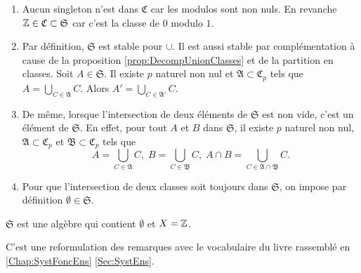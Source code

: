 \begin{rems}
 \begin{enumerate}
  \item  Aucun singleton n'est dans $\mathfrak{C}$ car les modulos sont non nuls. En revanche $\mathbb{Z} \in \mathfrak{C} \subset \mathfrak{S}$ car c'est la classe de $0$ modulo $1$.

  \item Par définition, $\mathfrak{S}$ est stable pour $\cup$. Il est aussi stable par complémentation à cause de la proposition \ref{prop:DecompUnionClasses} et de la partition en classes. Soit $A\in \mathfrak{S}$. Il existe $p$ naturel non nul et $\mathfrak{A}\subset \mathfrak{C}_p$ tels que $A = \bigcup_{C \in \mathfrak{A}} C$. Alors $A' = \bigcup_{C \in \mathfrak{A}'} C$.

  \item De même, lorsque l'intersection de deux éléments de $\mathfrak{S}$ est non vide, c'est un élément de $\mathfrak{S}$. En effet, pour tout $A$ et $B$ dans $\mathfrak{S}$, il existe $p$ naturel non nul, $\mathfrak{A}\subset \mathfrak{C}_p$ et $\mathfrak{B}\subset \mathfrak{C}_p$ tels que
  \begin{displaymath}
   A = \bigcup_{C \in \mathfrak{A}} C, \; B = \bigcup_{C \in \mathfrak{B}} C, \; A\cap B = \bigcup_{C \in \mathfrak{A}\cap \mathfrak{B}} C.
  \end{displaymath}

  \item Pour que l'intersection de deux classes soit toujours dans $\mathfrak{S}$, on impose par définition $\emptyset \in \mathfrak{S}$.
\end{enumerate}
\end{rems}

\begin{prop}
  $\mathfrak{S}$ est une algèbre qui contient $\emptyset$ et $X=\mathbb{Z}$.
\end{prop}
\begin{demo}
 C'est une reformulation des remarques avec le vocabulaire du livre rassemblé en \ref{Chap:SystFoncEns} \ref{Sec:SystEns}.
\end{demo}

